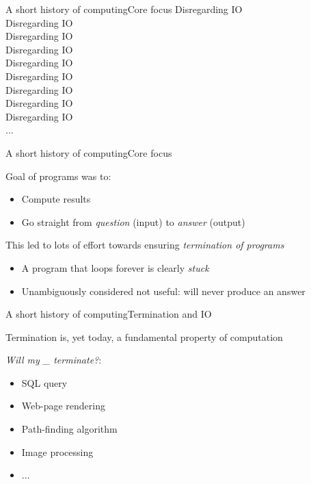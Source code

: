 \documentclass{beamer}
\begin{document}
\begin{textslide}{A short history of computing}{Core focus}{
\center
\Huge Disregarding IO \\
\huge Disregarding IO \\
\LARGE Disregarding IO \\
\Large Disregarding IO \\
Disregarding IO \\
\small Disregarding IO \\
\footnotesize Disregarding IO \\
\scriptsize Disregarding IO \\
\tiny Disregarding IO \\
\tiny ...
}\end{textslide}

\begin{slide}{A short history of computing}{Core focus}{
\item Goal of programs was to:
\begin{itemize}
\item Compute results
\item Go straight from \textit{question} (input) to \textit{answer} (output)
\end{itemize}
\item This led to lots of effort towards ensuring \textit{termination of programs}
\begin{itemize}
\item A program that loops forever is clearly \textit{stuck}
\item Unambiguously considered not useful: will never produce an answer
\end{itemize}
}\end{slide}

\begin{slide}{A short history of computing}{Termination and IO}{
\item Termination is, yet today, a fundamental property of computation
\item \textit{Will my \_ terminate?}:
\begin{itemize}
\item SQL query
\item Web-page rendering
\item Path-finding algorithm
\item Image processing
\item ...
\end{itemize}
}\end{slide}
\end{document}
